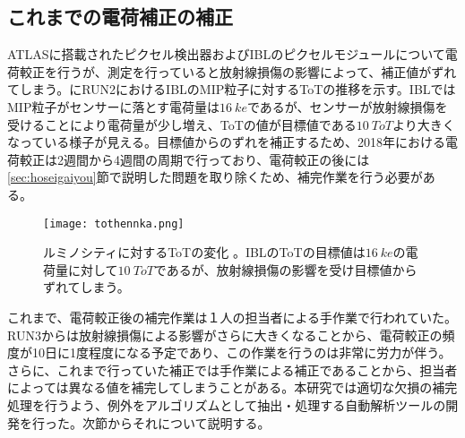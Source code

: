 \subsection{これまでの電荷補正の補正}
\label{sec:prehosei}

ATLASに搭載されたピクセル検出器およびIBLのピクセルモジュールについて電荷較正を行うが、測定を行っていると放射線損傷の影響によって、補正値がずれてしまう。にRUN2におけるIBLのMIP粒子に対するToTの推移を示す。IBLではMIP粒子がセンサーに落とす電荷量は$16\ \si{ke}$であるが、センサーが放射線損傷を受けることにより電荷量が少し増え、ToTの値が目標値である$10\ \si{ToT}$より大きくなっている様子が見える。目標値からのずれを補正するため、2018年における電荷較正は2週間から4週間の周期で行っており、電荷較正の後には\ref{sec:hoseigaiyou}節で説明した問題を取り除くため、補完作業を行う必要がある。

\begin{figure}[tbp]
  \centering
  \texttt{[image: tothennka.png]}
  \caption[ルミノシティに対するToTの変化]{ルミノシティに対するToTの変化 \cite{tothennka}。IBLのToTの目標値は$16\ \si{ke}$の電荷量に対して$10\ \si{ToT}$であるが、放射線損傷の影響を受け目標値からずれてしまう。}
  \label{fig:thresholdhennka}
\end{figure}

これまで、電荷較正後の補完作業は１人の担当者による手作業で行われていた。RUN3からは放射線損傷による影響がさらに大きくなることから、電荷較正の頻度が10日に1度程度になる予定であり、この作業を行うのは非常に労力が伴う。さらに、これまで行っていた補正では手作業による補正であることから、担当者によっては異なる値を補完してしまうことがある。本研究では適切な欠損の補完処理を行うよう、例外をアルゴリズムとして抽出・処理する自動解析ツールの開発を行った。次節からそれについて説明する。


